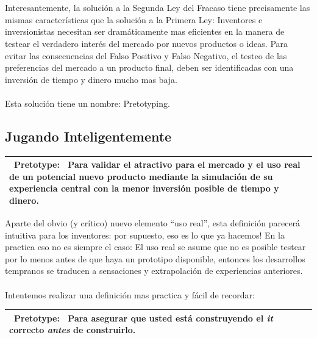 \documentclass{article}
\begin{document}
\\ \\
Interesantemente, la soluci\'on a la Segunda Ley del Fracaso tiene precisamente las mismas caracter\'isticas que la soluci\'on a la Primera Ley: Inventores e inversionistas necesitan ser dram\'aticamente mas eficientes en la manera de testear el verdadero inter\'es del mercado por nuevos productos o ideas.    Para evitar las consecuencias del Falso Positivo y Falso Negativo, el testeo de las preferencias del mercado a un producto final, deben ser identificadas con una inversi\'on de tiempo y dinero mucho mas baja.
\\ \\
Esta soluci\'on tiene un nombre: Pretotyping.

\newpage
\subsection{Jugando Inteligentemente}

\begin{table}[h]
\centering
    \begin{tabular}{|p{10cm}|}
    \hline
    \rowcolor{LightOrange} \ \newline \textbf{Pretotype:}
     \ \newline \newline Para validar el atractivo para el mercado y el \textbf{uso real} de un potencial nuevo producto mediante la simulaci\'on de su experiencia central con la \textbf{menor inversi\'on posible} de tiempo y dinero.\ \newline \\ \hline
    \end{tabular}
\end{table}

Aparte del obvio (y cr\'itico) nuevo elemento ``uso real'', esta definici\'on parecer\'a intuitiva para los inventores: por supuesto, eso es lo que ya hacemos!    En la practica eso no es siempre el caso: El uso real se asume que no es posible testear por lo menos antes de que haya un prototipo disponible, entonces los desarrollos tempranos se traducen a sensaciones y extrapolaci\'on de experiencias anteriores.
\\ \\
Intentemos realizar una definici\'on mas practica y f\'acil de recordar:
\begin{table}[h]
\centering
    \begin{tabular}{|p{10cm}|}
    \hline
    \rowcolor{LightOrange} \ \newline \textbf{Pretotype:}
     \ \newline \newline Para asegurar que usted est\'a construyendo el \textbf{\textit{it}} correcto \textbf{\textit{antes}} de construirlo.\ \newline \\ \hline
    \end{tabular}
\end{table}
\end{document}
